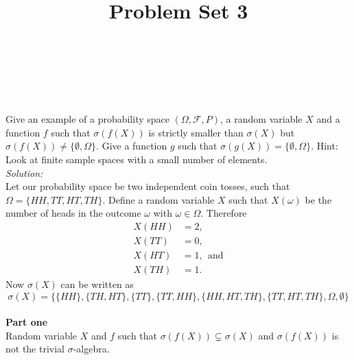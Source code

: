 \documentclass[10pt]{amsart}
\begin{document}
\noindent
{} \\
 \\
 \\
\title{Problem Set 3}
\maketitle

 Give an example of a probability space $(\Omega, \mathcal{F},P)$, a random variable $X$ and a function $f$ such that $\sigma(f(X))$ is strictly smaller than $\sigma(X)$ but $\sigma(f(X)) \neq \{\emptyset,\Omega\}$. Give a function $g$ such that $\sigma(g(X))=\{\emptyset,\Omega\}$. Hint: Look at finite sample spaces with a small number of elements. \\
\textit{Solution:} \\
Let our probability space be two independent coin tosses, such that $\Omega = \big\{HH, TT, HT, TH\big\}$.
Define a random variable $X$ such that $X(\omega)$ be the number of heads in the outcome $\omega$ with $\omega \in \Omega$.
Therefore
\begin{align*}
X(HH) &= 2, \\
X(TT) &= 0, \\
X(HT) &= 1, \:\: \text{and}\\
X(TH) &= 1.
\end{align*}
Now $\sigma(X)$ can be written as
$$
\sigma(X) = \bigg\{ \{HH\}, \{TH, HT\}, \{TT\}, \{TT, HH\}, \{HH, HT, TH\}, \{TT, HT, TH\}, \Omega, \emptyset \bigg\}
$$
\\
\textbf{Part one} \\
Random variable $X$ and $f$ such that $\sigma(f(X)) \subsetneq \sigma(X)$ and $\sigma(f(X))$ is not the trivial $\sigma$-algebra. \\
\end{document}
